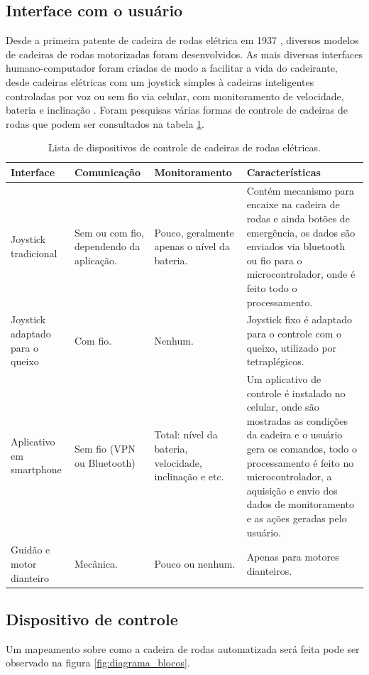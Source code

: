 \subsection{Interface com o usuário}
Desde a primeira patente de cadeira de rodas elétrica em 1937 \cite{patent_cadeira_rodas_eletrica}, diversos modelos de cadeiras de rodas motorizadas foram desenvolvidos. As mais diversas interfaces humano-computador foram criadas de modo a facilitar a vida do cadeirante, desde cadeiras elétricas com um joystick simples à cadeiras inteligentes controladas por voz ou sem fio via celular, com monitoramento de velocidade, bateria e inclinação \cite{artigo_controle_cadeira_eletrica}. Foram pesquisas várias formas de controle de cadeiras de rodas que podem ser consultados na tabela \ref{tab:interfaces}.

\begin{table}[!htb]
\centering
\begin{tabular}{|p{2cm}|p{3cm}|p{3cm}|p{4cm}|}
\hline
Interface & Comunicação & Monitoramento & Características \\ \hline
Joystick tradicional & Sem ou com fio, dependendo da aplicação. & Pouco, geralmente apenas o nível da bateria. & Contém mecanismo para encaixe na cadeira de rodas e ainda botões de emergência, os dados são enviados via bluetooth ou fio para o microcontrolador, onde é feito todo o processamento. \\ \hline
Joystick adaptado para o queixo & Com fio. & Nenhum. & Joystick fixo é adaptado para o controle com o queixo, utilizado por tetraplégicos. \\ \hline
Aplicativo em smartphone & Sem fio (VPN ou Bluetooth) & Total: nível da bateria, velocidade, inclinação e etc. & Um aplicativo de controle é instalado no celular, onde são mostradas as condições da cadeira e o usuário gera os comandos, todo o processamento é feito no microcontrolador, a aquisição e envio dos dados de monitoramento e as ações geradas pelo usuário. \\ \hline
Guidão e motor dianteiro & Mecânica. & Pouco ou nenhum. & Apenas para motores dianteiros. \\ \hline
\end{tabular}
\caption{Lista de dispositivos de controle de cadeiras de rodas elétricas.}
\label{tab:interfaces}
\end{table}

\subsection{Dispositivo de controle}
Um mapeamento sobre como a cadeira de rodas automatizada será feita pode ser observado na figura \ref{fig:diagrama_blocos}.

